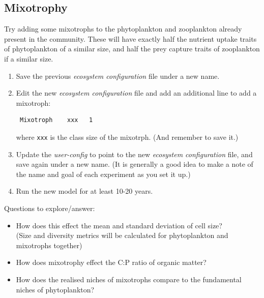\documentclass[11pt,fleqn]{book} %
\begin{document}
\subsection{Mixotrophy}

Try adding some mixotrophs to the phytoplankton and zooplankton already present in the community. These will have exactly half the nutrient uptake traits of phytoplankton of a similar size, and half the prey capture traits of zooplankton if a similar size. 

\vspace{2mm}
\begin{enumerate}[noitemsep]

\item Save the previous \textit{ecosystem configuration} file under a new name.

\item Edit the new \textit{ecosystem configuration} file and add an additional line to add a mixotroph:
\begin{verbatim}
 Mixotroph    xxx   1
\end{verbatim}
where \texttt{xxx} is the class size of the mixotrph. (And remember to save it.)

\item Update the \textit{user-config} to point to the new \textit{ecosystem configuration} file, and save again under a new name. (It is generally a good idea to make a note of the name and goal of each experiment as you set it up.)

\item Run the new model for at least 10-20 years. 

\end{enumerate}
\vspace{2mm}

Questions to explore/answer:

\vspace{2mm}
\begin{itemize}
\item How does this effect the mean and standard deviation of cell size?\\(Size and diversity metrics will be calculated for phytoplankton and mixotrophs together)
\item How does mixotrophy effect the C:P ratio of organic matter? 
\item How does the realised niches of mixotrophs compare to the fundamental niches of phytoplankton? 
\end{itemize}
\end{document}
